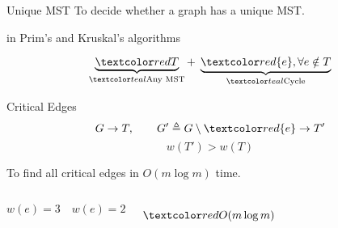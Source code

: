 \begin{frame}{}
  \begin{exampleblock}{Unique MST }
    To decide whether a graph has a unique MST.
  \end{exampleblock}

  \pause
  \vspace{0.80cm}
  \centerline{\large {} in Prim's and Kruskal's algorithms}

  \pause

  \pause
  \vspace{-0.30cm}
  \[
    \underbrace{\red{T}}_{\teal{\text{Any MST}}} +\; \underbrace{\red{\set{e}}, \forall e \notin T}_{\teal{\text{Cycle}}}
  \]

  \pause
  \centerline{}
\end{frame}

\begin{frame}{}
  \begin{exampleblock}{Critical Edges }
    \[
      G \to T, \qquad G' \triangleq G \setminus \red{\set{e}} \to T'
    \]
    \[
      w(T') > w(T)
    \]

    \pause
    \vspace{0.30cm}
    \centerline{To find all critical edges in $O(m \log m)$ time.}
  \end{exampleblock}

  \pause
  \begin{columns}
      \[
	w(e) = 3 \quad w(e) = 2
      \]
      \pause
      \centerline{}

      \pause
      \vspace{0.50cm}
      \centerline{}

      \pause
      \[
	\red{O(m \log m)}
      \]
  \end{columns}
\end{frame}
